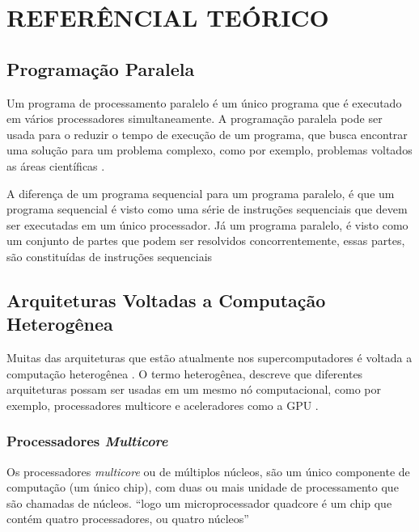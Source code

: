
\chapter{REFERÊNCIAL TEÓRICO}
\label{chap:ref-teorico}

\section{Programação Paralela}

Um programa de processamento paralelo é um único programa que é executado em vários processadores simultaneamente.
A programação paralela pode ser usada para o reduzir o tempo de execução de um programa,
que busca encontrar uma solução para um problema complexo, como por exemplo, problemas voltados as áreas científicas \cite{hennessy2014organizaccao}.

A diferença de um programa sequencial para um programa paralelo, é que um programa sequencial é visto como uma série de instruções
sequenciais que devem ser executadas em um único processador.
Já um programa paralelo, é visto como um conjunto de partes que podem ser resolvidos concorrentemente,
essas partes, são constituídas de instruções sequenciais \cite{hennessy2014organizaccao,tanenbaum20103a}

\section{Arquiteturas Voltadas a Computação Heterogênea}
Muitas das arquiteturas que estão atualmente nos supercomputadores é voltada a computação heterogênea \cite{meuer2014top500}.
O termo heterogênea, descreve que diferentes arquiteturas possam ser usadas em um mesmo nó computacional, como por exemplo, processadores multicore e aceleradores como a GPU \cite{intrArqHete:2012}.

\subsection{Processadores \textit{Multicore}}
Os processadores \textit{multicore} ou de múltiplos núcleos, são um único componente de computação (um único chip), com duas ou mais unidade de processamento que são chamadas de núcleos. \cite{blake2009survey}
“logo um microprocessador quadcore é um chip que contém quatro processadores, ou quatro núcleos” \cite[p.~31]{hennessy2014organizaccao}

